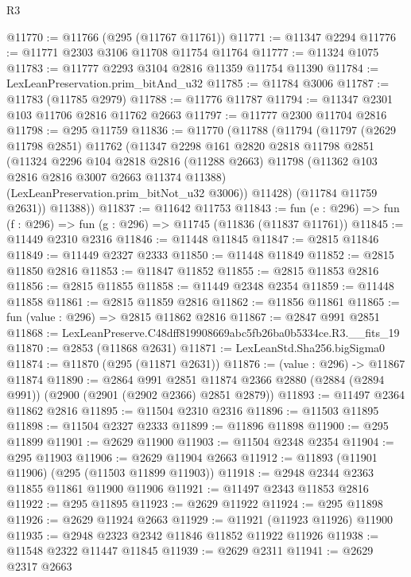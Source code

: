 \begin{lexlean}{R3}
\begin{coremodule}
@11770 := @11766 (@295 (@11767 @11761))
@11771 := @11347 @2294
@11776 := @11771 @2303 @3106 @11708 @11754 @11764
@11777 := @11324 @1075
@11783 := @11777 @2293 @3104 @2816 @11359 @11754 @11390
@11784 := LexLeanPreservation.prim_bitAnd_u32
@11785 := @11784 @3006
@11787 := @11783 (@11785 @2979)
@11788 := @11776 @11787
@11794 := @11347 @2301 @103 @11706 @2816 @11762 @2663
@11797 := @11777 @2300 @11704 @2816
@11798 := @295 @11759
@11836 := @11770
    (@11788
      (@11794
        (@11797
          (@2629 @11798 @2851)
          @11762
          (@11347
            @2298
            @161
            @2820
            @2818
            @11798
            @2851
            (@11324
              @2296
              @104
              @2818
              @2816
              (@11288 @2663)
              @11798
              (@11362 @103 @2816 @2816 @3007 @2663 @11374 @11388)
              (LexLeanPreservation.prim_bitNot_u32 @3006))
            @11428)
          (@11784 @11759 @2631))
        @11388))
@11837 := @11642 @11753
@11843 := fun (e : @296) => fun (f : @296) => fun (g : @296) => @11745 (@11836 (@11837 @11761))
@11845 := @11449 @2310 @2316
@11846 := @11448 @11845
@11847 := @2815 @11846
@11849 := @11449 @2327 @2333
@11850 := @11448 @11849
@11852 := @2815 @11850 @2816
@11853 := @11847 @11852
@11855 := @2815 @11853 @2816
@11856 := @2815 @11855
@11858 := @11449 @2348 @2354
@11859 := @11448 @11858
@11861 := @2815 @11859 @2816
@11862 := @11856 @11861
@11865 := fun (value : @296) => @2815 @11862 @2816
@11867 := @2847 @991 @2851
@11868 := LexLeanPreserve.C48dff819908669abc5fb26ba0b5334ce.R3.__fits_19
@11870 := @2853 (@11868 @2631)
@11871 := LexLeanStd.Sha256.bigSigma0
@11874 := @11870 (@295 (@11871 @2631))
@11876 := (value : @296) -> @11867 @11874
@11890 := @2864
    @991
    @2851
    @11874
    @2366
    @2880
    (@2884 (@2894 @991))
    (@2900 (@2901 (@2902 @2366) @2851 @2879))
@11893 := @11497 @2364 @11862 @2816
@11895 := @11504 @2310 @2316
@11896 := @11503 @11895
@11898 := @11504 @2327 @2333
@11899 := @11896 @11898
@11900 := @295 @11899
@11901 := @2629 @11900
@11903 := @11504 @2348 @2354
@11904 := @295 @11903
@11906 := @2629 @11904 @2663
@11912 := @11893 (@11901 @11906) (@295 (@11503 @11899 @11903))
@11918 := @2948 @2344 @2363 @11855 @11861 @11900 @11906
@11921 := @11497 @2343 @11853 @2816
@11922 := @295 @11895
@11923 := @2629 @11922
@11924 := @295 @11898
@11926 := @2629 @11924 @2663
@11929 := @11921 (@11923 @11926) @11900
@11935 := @2948 @2323 @2342 @11846 @11852 @11922 @11926
@11938 := @11548 @2322 @11447 @11845
@11939 := @2629 @2311
@11941 := @2629 @2317 @2663

\end{coremodule}
\end{lexlean}
